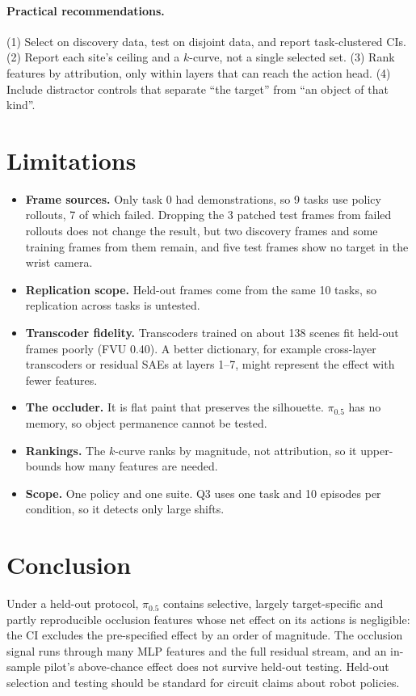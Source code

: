 \documentclass{article} %
\newcommand{\pifive}{$\pi_{0.5}$}
\begin{document}
\paragraph{Practical recommendations.} (1) Select on discovery data, test on disjoint data, and report task-clustered CIs. (2) Report each site's ceiling and a $k$-curve, not a single selected set. (3) Rank features by attribution, only within layers that can reach the action head. (4) Include distractor controls that separate ``the target'' from ``an object of that kind''.

\section{Limitations}
\label{sec:limitations}
\begin{itemize}[leftmargin=*,itemsep=1pt,topsep=2pt]
  \item \textbf{Frame sources.} Only task 0 had demonstrations, so 9 tasks use policy rollouts, 7 of which failed. Dropping the 3 patched test frames from failed rollouts does not change the result, but two discovery frames and some training frames from them remain, and five test frames show no target in the wrist camera.
  \item \textbf{Replication scope.} Held-out frames come from the same 10 tasks, so replication across tasks is untested.
  \item \textbf{Transcoder fidelity.} Transcoders trained on about 138 scenes fit held-out frames poorly (FVU 0.40). A better dictionary, for example cross-layer transcoders \citep{ameisen2025circuit} or residual SAEs at layers 1--7, might represent the effect with fewer features.
  \item \textbf{The occluder.} It is flat paint that preserves the silhouette. \pifive{} has no memory, so object permanence cannot be tested.
  \item \textbf{Rankings.} The $k$-curve ranks by magnitude, not attribution, so it upper-bounds how many features are needed.
  \item \textbf{Scope.} One policy and one suite. Q3 uses one task and 10 episodes per condition, so it detects only large shifts.
\end{itemize}

\section{Conclusion}
Under a held-out protocol, \pifive{} contains selective, largely target-specific and partly reproducible occlusion features whose net effect on its actions is negligible: the CI excludes the pre-specified effect by an order of magnitude. The occlusion signal runs through many MLP features and the full residual stream, and an in-sample pilot's above-chance effect does not survive held-out testing. Held-out selection and testing should be standard for circuit claims about robot policies.
\end{document}
